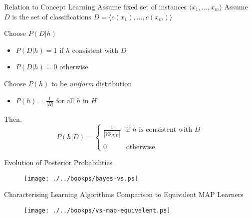 \documentclass[%
pdf,
colorBG,
slideColor,
tcrico,
]{prosper}
\begin{document}
\begin{slide}{ Relation to Concept Learning   }  
\tiny
Assume fixed set of instances $\langle x_{1}, \ldots, x_{m}\rangle$
Assume $D$ is the set of classifications $D = \langle c(x_{1}),
\ldots, c(x_{m})\rangle$ 

Choose $P(D|h)$
\begin{itemize}
\item $P(D|h)=1$ if $h$ consistent with $D$
\item $P(D|h)=0$ otherwise
\end{itemize}

Choose $P(h)$ to be {\em uniform} distribution
\begin{itemize}
\item $P(h) = \frac{1}{|H|}$ for all $h$ in $H$
\end{itemize}

Then,
\[ P(h|D) = \left\{ \begin{array}{cl}
  \frac{1}{|VS_{H,D}|} & \mbox{if $h$ is consistent with $D$} \\
\\
  0  & \mbox{otherwise} 
\end{array} \right.
\]
\end{slide}


\begin{slide}{ Evolution of Posterior Probabilities   }  
\begin{figure}
	\centering
	\texttt{[image: ./../bookps/bayes-vs.ps]}
\end{figure}
\end{slide}

\begin{slide}{ Characterising Learning Algorithms}
Comparison to Equivalent MAP Learners   
\begin{figure}
	\centering
	\texttt{[image: ./../bookps/vs-map-equivalent.ps]}
\end{figure}
\end{slide}

\end{document}
